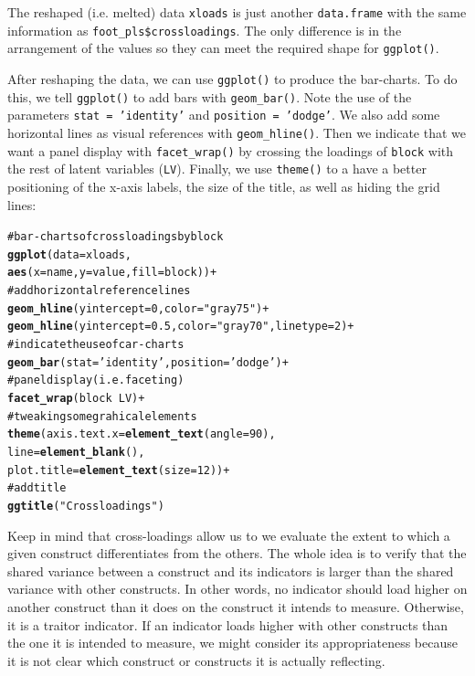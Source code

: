 \documentclass[12pt]{book}\usepackage{graphicx, color}
\makeatletter
\newcommand{\hlfunctioncall}[1]{\textcolor[rgb]{0.501960784313725,0,0.329411764705882}{\textbf{#1}}}%
\newcommand{\hlstring}[1]{\textcolor[rgb]{0.6,0.6,1}{#1}}%
\newcommand{\hlcomment}[1]{\textcolor[rgb]{0.180392156862745,0.6,0.341176470588235}{#1}}%
\newenvironment{kframe}{%
 \def\at@end@of@kframe{}%
 \ifinner\ifhmode%
  \def\at@end@of@kframe{\end{minipage}}%
  \begin{minipage}{\columnwidth}%
 \fi\fi%
 \def\FrameCommand##1{\hskip\@totalleftmargin \hskip-\fboxsep
 \colorbox{shadecolor}{##1}\hskip-\fboxsep
     \hskip-\linewidth \hskip-\@totalleftmargin \hskip\columnwidth}%
 \MakeFramed {\advance\hsize-\width
   \@totalleftmargin\z@ \linewidth\hsize
   \@setminipage}}%
 {\par\unskip\endMakeFramed%
 \at@end@of@kframe}
\newenvironment{knitrout}{}{} %
\newcommand{\code}[1]{\texttt{#1}}
\makeatother
\begin{document}
The reshaped (i.e. melted) data \code{xloads} is just another \code{data.frame} with the same information as \code{foot\_pls\$crossloadings}. The only difference is in the arrangement of the values so they can meet the required shape for \code{ggplot()}.

After reshaping the data, we can use \code{ggplot()} to produce the bar-charts. To do this, we tell \code{ggplot()} to add bars with \code{geom\_bar()}. Note the use of the parameters \code{stat = 'identity'} and \code{position = 'dodge'}. We also add some horizontal lines as visual references with \code{geom\_hline()}. Then we indicate that we want a panel display with \code{facet\_wrap()} by crossing the loadings of \code{block} with the rest of latent variables (\code{LV}). Finally, we use \code{theme()} to a have a better positioning of the x-axis labels, the size of the title, as well as hiding the grid lines:
\begin{knitrout}
\color{fgcolor}\begin{kframe}
\begin{alltt}
\hlcomment{# bar-charts of crossloadings by block}
\hlfunctioncall{ggplot}(data = xloads,
       \hlfunctioncall{aes}(x = name, y = value, fill = block)) +
\hlcomment{  # add horizontal reference lines}
  \hlfunctioncall{geom_hline}(yintercept = 0, color = \hlstring{"gray75"}) + 
  \hlfunctioncall{geom_hline}(yintercept = 0.5, color = \hlstring{"gray70"}, linetype = 2) +
\hlcomment{  # indicate the use of car-charts}
  \hlfunctioncall{geom_bar}(stat = \hlstring{'identity'}, position = \hlstring{'dodge'}) +
\hlcomment{  # panel display (i.e. faceting)}
  \hlfunctioncall{facet_wrap}(block ~ LV) +
\hlcomment{  # tweaking some grahical elements}
  \hlfunctioncall{theme}(axis.text.x = \hlfunctioncall{element_text}(angle = 90),
        line = \hlfunctioncall{element_blank}(),
        plot.title = \hlfunctioncall{element_text}(size = 12)) +
\hlcomment{  # add title}
  \hlfunctioncall{ggtitle}(\hlstring{"Crossloadings"})
\end{alltt}
\end{kframe}
\end{knitrout}


\vspace{3mm}
Keep in mind that cross-loadings allow us to we evaluate the extent to which a given construct differentiates from the others. The whole idea is to verify that the shared variance between a construct and its indicators is larger than the shared variance with other constructs. In other words, no indicator should load higher on another construct than it does on the construct it intends to measure. Otherwise, it is a traitor indicator. If an indicator loads higher with other constructs than the one it is intended to measure, we might consider its appropriateness because it is not clear which construct or constructs it is actually reflecting.
\end{document}
